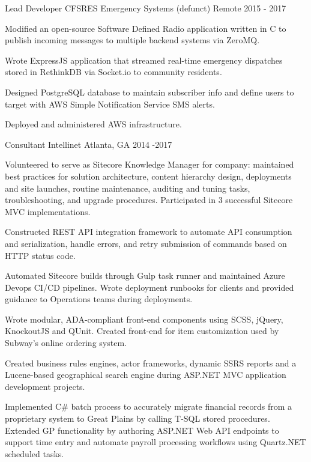 \begin{cventries}
  \cventry
    {Lead Developer} %
    {CFSRES Emergency Systems (defunct)} %
    {Remote} %
    {2015 - 2017} %
    {
      \begin{cvitems} %
        \item {Modified an open-source Software Defined Radio application written in C to publish incoming messages to multiple backend systems via ZeroMQ.}
        \item {Wrote ExpressJS application that streamed real-time emergency dispatches stored in RethinkDB via Socket.io to community residents.}
        \item {Designed PostgreSQL database to maintain subscriber info and define users to target with AWS Simple Notification Service SMS alerts.}
        \item {Deployed and administered AWS infrastructure.}
      \end{cvitems}
    }

  \cventry
    {Consultant} %
    {Intellinet} %
    {Atlanta, GA} %
    {2014 -2017 } %
    {
      \begin{cvitems} %
        \item {Volunteered to serve as Sitecore Knowledge Manager for company: maintained best practices for solution architecture, content hierarchy design, deployments and site launches, routine maintenance, auditing and tuning tasks, troubleshooting, and upgrade procedures. Participated in 3 successful Sitecore MVC implementations.}
		\item {Constructed REST API integration framework to automate API consumption and serialization, handle errors, and retry submission of commands based on HTTP status code.}
		\item {Automated Sitecore builds through Gulp task runner and maintained Azure Devops CI/CD pipelines. Wrote deployment runbooks for clients and provided guidance to Operations teams during deployments.}
		\item {Wrote modular, ADA-compliant front-end components using SCSS, jQuery, KnockoutJS and QUnit. Created front-end for item customization used by Subway’s online ordering system.}
		\item {Created business rules engines, actor frameworks, dynamic SSRS reports and a Lucene-based geographical search engine during ASP.NET MVC application development projects.}
		\item {Implemented C# batch process to accurately migrate financial records from a proprietary system to Great Plains by calling T-SQL stored procedures. Extended GP functionality by authoring ASP.NET Web API endpoints to support time entry and automate payroll processing workflows using Quartz.NET scheduled tasks.}
      \end{cvitems}
    }


\end{cventries}
